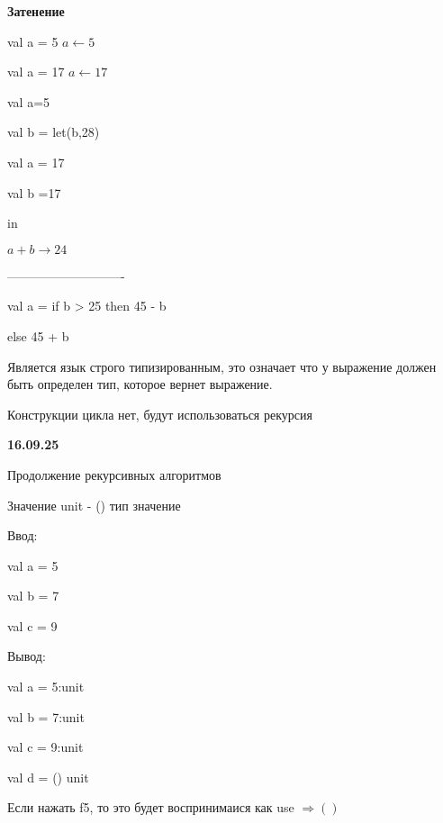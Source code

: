 \documentclass{article}
\begin{document}
\vspace{2mm}

\textbf{Затенение} 

val a = 5  \hspace{2mm} $a\leftarrow 5$

val a = 17 \hspace{2mm} $a\leftarrow 17$

\vspace{2mm}

val a=5

val b = let(b,28)

\hspace{15mm} val a = 17

\hspace{15mm} val b =17

in 

\hspace{15mm} $a+b \rightarrow 24$

----------------------------

\vspace{5mm}

val a = if b > 25 then 45 - b

\hspace{10mm} else 45 + b



Является язык строго типизированным, это означает что у выражение должен быть определен тип,
которое вернет выражение.

Конструкции цикла нет, будут использоваться рекурсия



\textbf{16.09.25}

Продолжение рекурсивных алгоритмов

Значение unit - () тип значение

Ввод:

val a = 5
 
val b = 7

val c = 9

\vspace{5mm}

Вывод:

val a = 5:unit
 
val b = 7:unit

val c = 9:unit

val d = () unit

Если нажать f5, то это будет воспринимаися как use $\Rightarrow ()$

\vspace{5mm}
\end{document}

